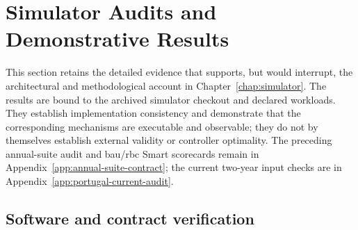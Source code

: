 \section{Simulator Audits and Demonstrative Results}
\label{app:simulator-audit-evidence}

This section retains the detailed evidence that supports, but would interrupt, the architectural and methodological account in Chapter~\ref{chap:simulator}. The results are bound to the archived simulator checkout and declared workloads. They establish implementation consistency and demonstrate that the corresponding mechanisms are executable and observable; they do not by themselves establish external validity or controller optimality. The preceding annual-suite audit and \gls{bau}/\gls{rbc} Smart scorecards remain in Appendix~\ref{app:annual-suite-contract}; the current two-year input checks are in Appendix~\ref{app:portugal-current-audit}.

\subsection{Software and contract verification}

